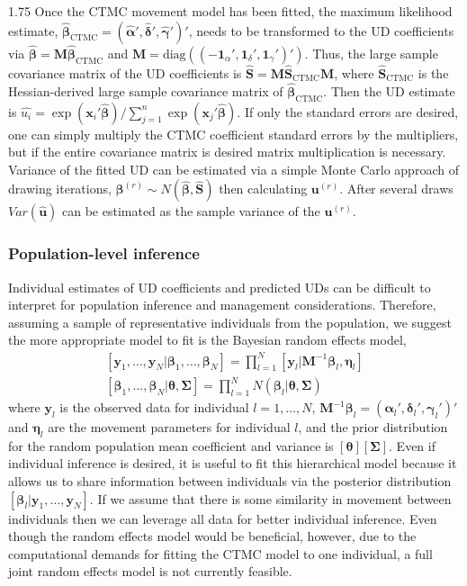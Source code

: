 \documentclass[12pt]{article}
\newcommand{\by}{\ensuremath{\mathbf{y}}}
\newcommand{\bx}{\ensuremath{\mathbf{x}}}
\newcommand{\bM}{\ensuremath{\mathbf{M}}}
\newcommand{\bu}{\ensuremath{\mathbf{u}}}
\newcommand{\bb}{\ensuremath{\boldsymbol{\beta}}}
\newcommand{\bg}{\ensuremath{\boldsymbol{\gamma}}}
\newcommand{\ba}{\ensuremath{\boldsymbol{\alpha}}}
\newcommand{\bSig}{\ensuremath{\boldsymbol{\Sigma}}}
\newcommand{\bd}{\ensuremath{\boldsymbol{\delta}}}
\newcommand{\bt}{\ensuremath{\boldsymbol{\theta}}}
\newcommand{\bn}{\ensuremath{\boldsymbol{\eta}}}
\begin{document}
\begin{spacing}{1.75}
Once the CTMC movement model has been fitted, the maximum likelihood estimate, $\hat{\bb}_\text{CTMC}= (\hat{\ba}', \hat{\bd}', \hat{\bg}')'$, needs to be transformed to the UD coefficients via $\hat{\bb} = \bM \hat{\bb}_\text{CTMC}$ and $\bM = \text{diag}((-\mathbf{1}_\alpha', \mathbf{1}_\delta', \mathbf{1}_\gamma')')$. Thus, the large sample covariance matrix of the UD coefficients is $\hat{\mathbf{S}} = \bM \hat{\mathbf{S}}_\text{CTMC} \bM$, where $\hat{\mathbf{S}}_\text{CTMC}$ is the Hessian-derived large sample covariance matrix of $\hat{\bb}_\text{CTMC}$. Then the UD estimate is $\hat{u_i} = \exp(\bx_i' \hat{\bb})/\sum_{j=1}^n \exp(\bx_j' \hat{\bb})$. If only the standard errors are desired, one can simply multiply the CTMC coefficient standard errors by the multipliers, but if the entire covariance matrix is desired matrix multiplication is necessary. Variance of the fitted UD can be estimated via a simple Monte Carlo approach of drawing iterations, $\bb^{(r)} \sim N(\hat{\bb}, \hat{\mathbf{S}})$ then calculating $\bu^{(r)}$. After several draws $Var(\hat{\bu})$ can be estimated as the sample variance of the $\bu^{(r)}$.

\subsubsection{Population-level inference}

Individual estimates of UD coefficients and predicted UDs can be difficult to interpret for population inference and management considerations. Therefore, assuming a sample of representative individuals from the population, we suggest the more appropriate model to fit is the Bayesian random effects model,
\[
\begin{array}{c}
{}[\by_1,\dots,\by_N|\bb_1,\dots,\bb_N] = \prod_{l=1}^N [\by_l|\bM^{-1}\bb_l, \bn_l] \\
{}[\bb_1,\dots,\bb_N|\bt, \bSig] = \prod_{l=1}^N N(\bb_l|\bt, \bSig)
\end{array}
\]
where $\by_l$ is the observed data for individual $l=1,\dots,N$, $\bM^{-1}\bb_l = (\ba_l', \bd_l', \bg_l')'$ and $\bn_l$ are the movement parameters for individual $l$, and the prior distribution for the random population mean coefficient and variance is $[\bt][\bSig]$. Even if individual inference is desired, it is useful to fit this hierarchical model because it allows us to share information between individuals via the posterior distribution $[\bb_l|\by_1,\dots,\by_N]$. If we assume that there is some similarity in movement between individuals then we can leverage all data for better individual inference. Even though the random effects model would be beneficial, however, due to the computational demands for fitting the CTMC model to one individual, a full joint random effects model is not currently feasible. 


\end{spacing}
\end{document}
